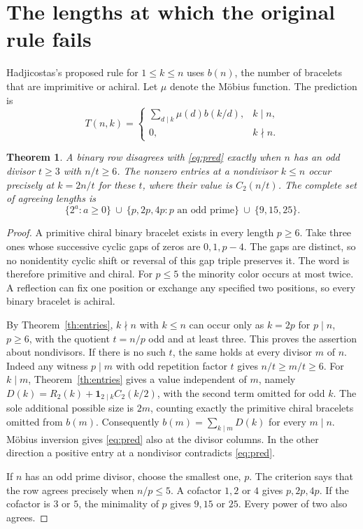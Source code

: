 \documentclass[11pt,letterpaper]{article}
\newtheorem{theorem}{Theorem}
\newcommand{\one}{\mathbf 1}
\begin{document}
\section{The lengths at which the original rule fails}
Hadjicostas's proposed rule for $1\le k\le n$ uses $b(n)$, the number of bracelets that are imprimitive or achiral. Let $\mu$ denote the Möbius function. The prediction is
\begin{equation}\label{eq:pred}
 T(n,k)=
 \begin{cases}
 \sum_{d\mid k}\mu(d)b(k/d),& k\mid n,\\
 0,& k\nmid n .
 \end{cases}
\end{equation}
\begin{theorem}\label{th:fail}
A binary row disagrees with \eqref{eq:pred} exactly when $n$ has an odd divisor $t\ge3$ with $n/t\ge6$. The nonzero entries at a nondivisor $k\le n$ occur precisely at $k=2n/t$ for these $t$, where their value is $C_2(n/t)$. The complete set of agreeing lengths is
\[
 \{2^a:a\ge0\}\ \cup\ \{p,2p,4p:p\text{ an odd prime}\}\ \cup\ \{9,15,25\}.
\]
\end{theorem}
\begin{proof}
A primitive chiral binary bracelet exists in every length $p\ge6$. Take three ones whose successive cyclic gaps of zeros are $0,1,p-4$. The gaps are distinct, so no nonidentity cyclic shift or reversal of this gap triple preserves it. The word is therefore primitive and chiral. For $p\le5$ the minority color occurs at most twice. A reflection can fix one position or exchange any specified two positions, so every binary bracelet is achiral.

By Theorem~\ref{th:entries}, $k\nmid n$ with $k\le n$ can occur only as $k=2p$ for $p\mid n$, $p\ge6$, with the quotient $t=n/p$ odd and at least three. This proves the assertion about nondivisors. If there is no such $t$, the same holds at every divisor $m$ of $n$. Indeed any witness $p\mid m$ with odd repetition factor $t$ gives $n/t\ge m/t\ge6$. For $k\mid m$, Theorem~\ref{th:entries} gives a value independent of $m$, namely $D(k)=R_2(k)+\one_{2\mid k}C_2(k/2)$, with the second term omitted for odd $k$. The sole additional possible size is $2m$, counting exactly the primitive chiral bracelets omitted from $b(m)$. Consequently $b(m)=\sum_{k\mid m}D(k)$ for every $m\mid n$. Möbius inversion gives \eqref{eq:pred} also at the divisor columns. In the other direction a positive entry at a nondivisor contradicts \eqref{eq:pred}.

If $n$ has an odd prime divisor, choose the smallest one, $p$. The criterion says that the row agrees precisely when $n/p\le5$. A cofactor $1,2$ or $4$ gives $p,2p,4p$. If the cofactor is $3$ or $5$, the minimality of $p$ gives $9,15$ or $25$. Every power of two also agrees.
\end{proof}
\end{document}
